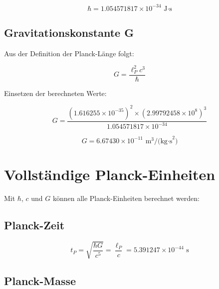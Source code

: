 	\begin{tcolorbox}[colback=green!5!white,colframe=green!75!black,title=Reduzierte Planck-Konstante]
		\begin{equation}
			\boxed{\hbar = 1.054571817 \times 10^{-34} \text{ J·s}}
		\end{equation}
	\end{tcolorbox}
	
	\subsection{Gravitationskonstante G}
	
	Aus der Definition der Planck-Länge folgt:
	
	\begin{equation}
		G = \frac{\ell_P^2 c^3}{\hbar}
	\end{equation}
	
	Einsetzen der berechneten Werte:
	
	\begin{equation}
		G = \frac{(1.616255 \times 10^{-35})^2 \times (2.99792458 \times 10^8)^3}{1.054571817 \times 10^{-34}}
	\end{equation}
	
	\begin{tcolorbox}[colback=green!5!white,colframe=green!75!black,title=Gravitationskonstante]
		\begin{equation}
			\boxed{G = 6.67430 \times 10^{-11} \text{ m}^3\text{/(kg·s}^2\text{)}}
		\end{equation}
	\end{tcolorbox}
	
	\section{Vollständige Planck-Einheiten}
	
	Mit $\hbar$, $c$ und $G$ können alle Planck-Einheiten berechnet werden:
	
	\subsection{Planck-Zeit}
	
	\begin{equation}
		t_P = \sqrt{\frac{\hbar G}{c^5}} = \frac{\ell_P}{c} = 5.391247 \times 10^{-44} \text{ s}
	\end{equation}
	
	\subsection{Planck-Masse}
	
